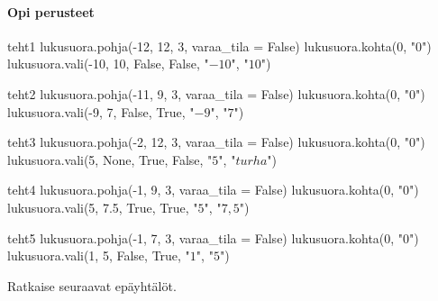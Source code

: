 \begin{tehtavasivu}

\paragraph*{Opi perusteet}

\begin{luoKuva}{teht1}
lukusuora.pohja(-12, 12, 3, varaa_tila = False)
lukusuora.kohta(0, "$0$")
lukusuora.vali(-10, 10, False, False, "$-10$", "$10$")
\end{luoKuva}

\begin{luoKuva}{teht2}
lukusuora.pohja(-11, 9, 3, varaa_tila = False)
lukusuora.kohta(0, "$0$")
lukusuora.vali(-9, 7, False, True, "$-9$", "$7$")
\end{luoKuva}

\begin{luoKuva}{teht3}
lukusuora.pohja(-2, 12, 3, varaa_tila = False)
lukusuora.kohta(0, "$0$")
lukusuora.vali(5, None, True, False, "$5$", "$turha$")
\end{luoKuva}

\begin{luoKuva}{teht4}
lukusuora.pohja(-1, 9, 3, varaa_tila = False)
lukusuora.kohta(0, "$0$")
lukusuora.vali(5, 7.5, True, True, "$5$", "$7,5$")
\end{luoKuva}

\begin{luoKuva}{teht5}
lukusuora.pohja(-1, 7, 3, varaa_tila = False)
lukusuora.kohta(0, "$0$")
lukusuora.vali(1, 5, False, True, "$1$", "$5$")
\end{luoKuva}

\begin{tehtava}
    Ratkaise seuraavat epäyhtälöt.
    \begin{alakohdat}
    \end{alakohdat}
    \begin{vastaus}
        \begin{alakohdat}
        \end{alakohdat}
    \end{vastaus}
\end{tehtava}


\end{tehtavasivu}
